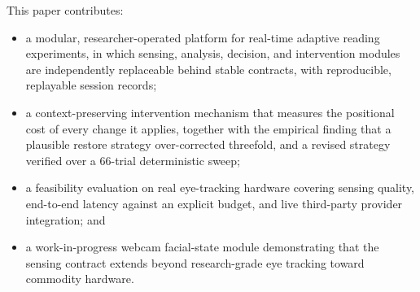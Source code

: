 This paper contributes:
\begin{itemize}
\item a modular, researcher-operated platform for real-time adaptive reading experiments, in which sensing, analysis, decision, and intervention modules are independently replaceable behind stable contracts, with reproducible, replayable session records;
\item a context-preserving intervention mechanism that measures the positional cost of every change it applies, together with the empirical finding that a plausible restore strategy over-corrected threefold, and a revised strategy verified over a 66-trial deterministic sweep;
\item a feasibility evaluation on real eye-tracking hardware covering sensing quality, end-to-end latency against an explicit budget, and live third-party provider integration; and
\item a work-in-progress webcam facial-state module demonstrating that the sensing contract extends beyond research-grade eye tracking toward commodity hardware.
\end{itemize}
